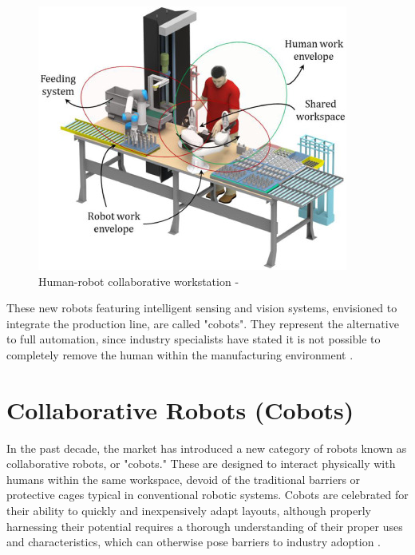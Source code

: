 \begin{figure}[!htbp]
    \centering
    \includegraphics[width=0.55\linewidth]{figs/human-robot-collab-env.jpg}
    \caption{Human-robot collaborative workstation - \cite{MALIK2021102092}} 
    \label{fig:hrc-workstation}
\end{figure} 


These new robots featuring intelligent sensing and vision systems, envisioned to integrate the production line, are called "cobots". 
They represent the alternative to full automation, since industry specialists have stated it is not possible to completely remove the 
human within the manufacturing environment \cite{Weiss2021}.


\section{Collaborative Robots (Cobots)} 


In the past decade, the market has introduced a new category of robots known as collaborative robots, or "cobots." These are designed to interact 
physically with humans within the same workspace, devoid of the traditional barriers or protective cages typical in conventional robotic systems. 
Cobots are celebrated for their ability to quickly and inexpensively adapt layouts, although properly harnessing their potential requires a thorough 
understanding of their proper uses and characteristics, which can otherwise pose barriers to industry adoption \cite{robotics8040100}.


